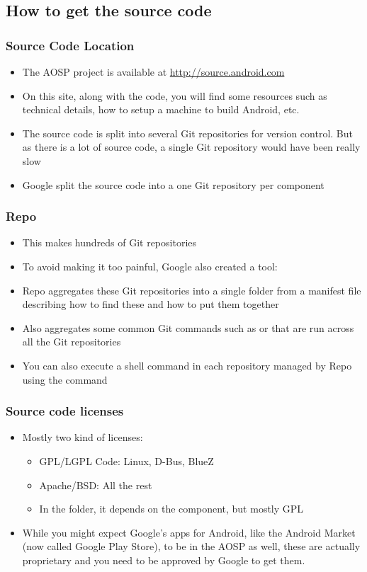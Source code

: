 \subsection{How to get the source code}
\begin{frame}
  \frametitle{Source Code Location}
  \begin{itemize}
  \item The AOSP project is available at
    \url{http://source.android.com}
  \item On this site, along with the code, you will find some resources
    such as technical details, how to setup a machine to build
    Android, etc.
  \item The source code is split into several Git repositories for
    version control. But as there is a lot of source code, a single
    Git repository would have been really slow
  \item Google split the source code into a one Git repository per
    component
  \end{itemize}
\end{frame}

\begin{frame}
  \frametitle{Repo}
  \begin{itemize}
  \item This makes hundreds of Git repositories\!
  \item To avoid making it too painful, Google also created a tool:
  \item Repo aggregates these Git repositories into a single folder
    from a manifest file describing how to find these and how to put
    them together
  \item Also aggregates some common Git commands such as 
    or  that are run across all the Git repositories
  \item You can also execute a shell command in each repository
    managed by Repo using the  command
  \end{itemize}
\end{frame}

\begin{frame}
  \frametitle{Source code licenses}
  \begin{itemize}
  \item Mostly two kind of licenses:
    \begin{itemize}
    \item GPL/LGPL Code: Linux, D-Bus, BlueZ
    \item Apache/BSD: All the rest
    \item In the  folder, it depends on the component,
      but mostly GPL
    \end{itemize}
  \item While you might expect Google's apps for Android, like the
    Android Market (now called Google Play Store), to be in the AOSP
    as well, these are actually proprietary and you need to be
    approved by Google to get them.
  \end{itemize}
\end{frame}
